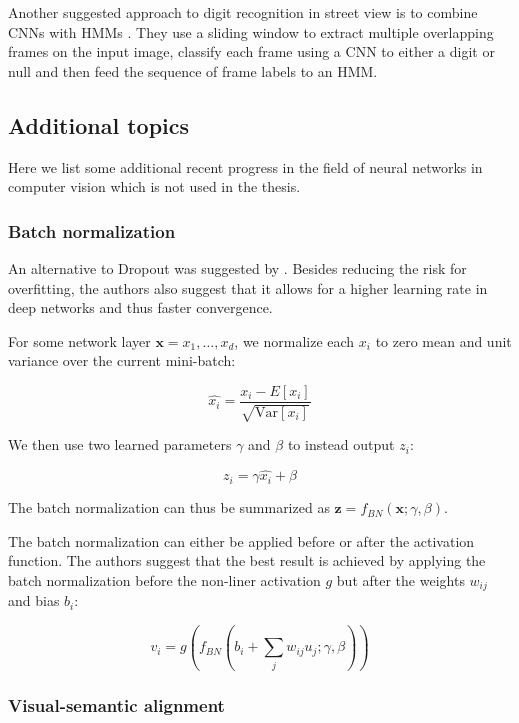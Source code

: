 Another suggested approach to digit recognition in street view is to combine CNNs with HMMs \cite{multidigit_streetview_CNN_HMM}. They use a sliding window to extract multiple overlapping frames on the input image, classify each frame using a CNN to either a digit or null and then feed the sequence of frame labels to an HMM.



\subsection{Additional topics}

Here we list some additional recent progress in the field of neural networks in computer vision which is not used in the thesis.

\subsubsection{Batch normalization}

An alternative to Dropout was suggested by \cite{BatchNormalization}. Besides reducing the risk for overfitting, the authors also suggest that it allows for a higher learning rate in deep networks and thus faster convergence.

For some network layer $\mathbf{x} = {x_1, \ldots, x_d}$, we normalize each $x_i$ to zero mean and unit variance over the current mini-batch:

\[
\hat{x_i} = \frac{x_i - E[x_i]}{ \sqrt{\text{Var} [x_i]} }
\]

We then use two learned parameters $\gamma$ and $\beta$ to instead output $z_i$:

\[
z_i = \gamma \hat{x_i} + \beta
\]

The batch normalization can thus be summarized as $\mathbf{z} = f_{BN}(\mathbf{x}; \gamma, \beta)$.

The batch normalization can either be applied before or after the activation function. The authors suggest that the best result is achieved by applying the batch normalization before the non-liner activation $g$ but after the weights $w_{ij}$ and bias $b_i$:

\[
v_i = g\left( f_{BN}\left( b_i + \sum_j w_{ij} u_j; \gamma, \beta \right) \right)
\]

\subsubsection{Visual-semantic alignment}

